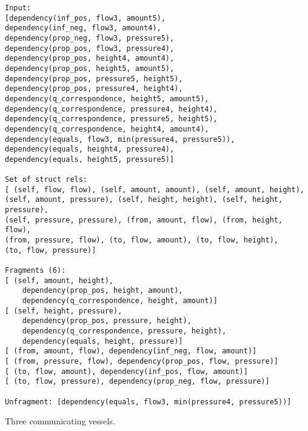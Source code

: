 \documentclass{article} %
\begin{document}
\begin{verbatim}
Input: 
[dependency(inf_pos, flow3, amount5), 
dependency(inf_neg, flow3, amount4), 
dependency(prop_neg, flow3, pressure5), 
dependency(prop_pos, flow3, pressure4), 
dependency(prop_pos, height4, amount4), 
dependency(prop_pos, height5, amount5), 
dependency(prop_pos, pressure5, height5), 
dependency(prop_pos, pressure4, height4), 
dependency(q_correspondence, height5, amount5), 
dependency(q_correspondence, pressure4, height4), 
dependency(q_correspondence, pressure5, height5), 
dependency(q_correspondence, height4, amount4), 
dependency(equals, flow3, min(pressure4, pressure5)), 
dependency(equals, height4, pressure4), 
dependency(equals, height5, pressure5)]

Set of struct rels: 
[ (self, flow, flow), (self, amount, amount), (self, amount, height), 
(self, amount, pressure), (self, height, height), (self, height, pressure),
(self, pressure, pressure), (from, amount, flow), (from, height, flow), 
(from, pressure, flow), (to, flow, amount), (to, flow, height), 
(to, flow, pressure)]

Fragments (6):
[ (self, amount, height), 
	dependency(prop_pos, height, amount), 
	dependency(q_correspondence, height, amount)]
[ (self, height, pressure), 
	dependency(prop_pos, pressure, height), 
	dependency(q_correspondence, pressure, height), 
	dependency(equals, height, pressure)]
[ (from, amount, flow), dependency(inf_neg, flow, amount)]
[ (from, pressure, flow), dependency(prop_pos, flow, pressure)]
[ (to, flow, amount), dependency(inf_pos, flow, amount)]
[ (to, flow, pressure), dependency(prop_neg, flow, pressure)]

Unfragment: [dependency(equals, flow3, min(pressure4, pressure5))]
\end{verbatim}

Three communicating vessels.
\end{document}
